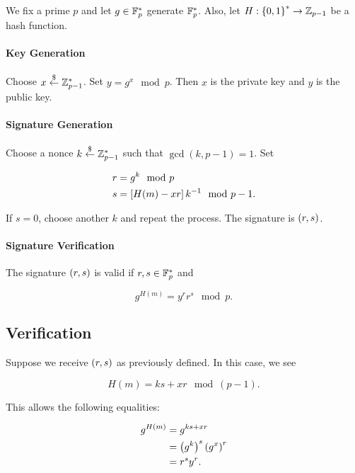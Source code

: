 \begin{defn}
We fix a prime $p$ and let $g\in\mathbb{F}_{p}^{*}$ generate $\mathbb{F}_{p}^{*}$.
Also, let $H:\left\{ 0,1 \right\}^{*}\to\mathbb{Z}_{p-1}$ be a \gls{hash function}.

\paragraph{Key Generation}
Choose $x\stackrel{\$}{\leftarrow}{}\mathbb{Z}_{p-1}^{*}$.
Set $y = g^{x} \mod p$.
Then $x$ is the private key and $y$ is the public key.

\paragraph{Signature Generation}
Choose a \gls{nonce} $k\stackrel{\$}{\leftarrow}{}\mathbb{Z}_{p-1}^{*}$
such that $\gcd(k,p-1) = 1$.
Set

\begin{align}
    r &= g^{k} \mod p \nonumber\\
    s &= \left[ H(m) - xr \right]k^{-1} \mod p-1.
\end{align}

\noindent
If $s=0$, choose another $k$ and repeat the process.
The signature is $\left( r,s \right)$.

\paragraph{Signature Verification}
The signature $\left( r,s \right)$ is valid if $r,s\in\mathbb{F}_{p}^{*}$ and

\begin{equation}
    g^{H(m)} = y^{r}r^{s} \mod p.
\end{equation}
\end{defn}

\subsection{Verification}

Suppose we receive $\left( r,s \right)$ as previously defined.
In this case, we see

\begin{equation}
    H(m) = ks + xr \mod (p-1).
\end{equation}

\noindent
This allows the following equalities:

\begin{align}
    g^{H(m)} &= g^{ks + xr} \nonumber\\
        &= \left( g^{k} \right)^{s}\left( g^{x} \right)^{r} \nonumber\\
        &= r^{s}y^{r}.
\end{align}

